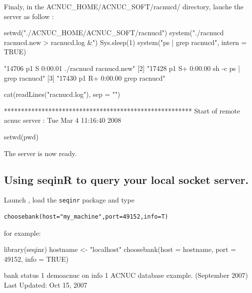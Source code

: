 \documentclass{article}
\begin{document}
Finaly, in the ACNUC\_HOME/ACNUC\_SOFT/racnucd/ directory, lauche the server as follow :

\begin{Schunk}
\begin{Sinput}
 setwd("./ACNUC_HOME/ACNUC_SOFT/racnucd")
 system("./racnucd racnucd.new > racnucd.log &")
 Sys.sleep(1)
 system("ps | grep racnucd", intern = TRUE)
\end{Sinput}
\begin{Soutput}
[1] "14706  p1  S      0:00.01 ./racnucd racnucd.new"  
[2] "17428  p1  S+     0:00.00 sh -c ps | grep racnucd"
[3] "17430  p1  R+     0:00.00 grep racnucd"           
\end{Soutput}
\begin{Sinput}
 cat(readLines("racnucd.log"), sep = "\n")
\end{Sinput}
\begin{Soutput}
*******************************************************
Start of remote acnuc server : Tue Mar  4 11:16:40 2008
\end{Soutput}
\begin{Sinput}
 setwd(pwd)
\end{Sinput}
\end{Schunk}

The server is now ready.

\subsection{Using seqinR to query your local socket server.}

Launch \Rlogo{}, load the \texttt{seqinr} package  and type


\begin{verbatim}
choosebank(host="my_machine",port=49152,info=T)
\end{verbatim}

for example:


\begin{Schunk}
\begin{Sinput}
 library(seqinr)
 hostname <- "localhost"
 choosebank(host = hostname, port = 49152, info = TRUE)
\end{Sinput}
\begin{Soutput}
       bank status
1 demoacnuc     on
                                                                 info
1 ACNUC database example. (September 2007) Last Updated: Oct 15, 2007
\end{Soutput}
\end{Schunk}
\end{document}
